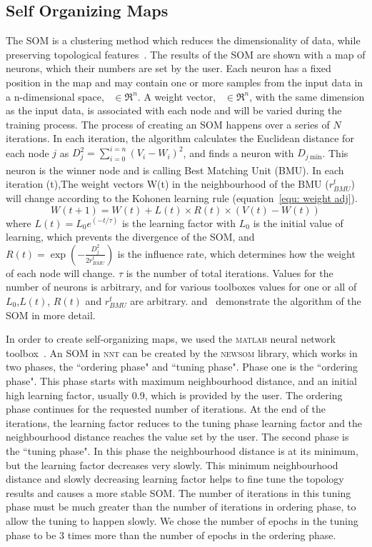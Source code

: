  \subsection{Self Organizing Maps}
 \label{sec: som}
 The SOM is a clustering method which reduces the dimensionality of data, while preserving topological features~\citep{Kohonen98}. 
 The results of the SOM are shown with a map of neurons, which their numbers are set by the user.
 Each neuron has a fixed position in the map and may contain one or more samples from the input data in a n-dimensional space,~ $\in \Re^n$.
 A weight vector,~ $\in \Re^n$, with the same dimension as the input data, is associated with each node and will be varied during the training process.
 The process of creating an SOM happens over a series of $N$ iterations.
 In each iteration, the algorithm calculates the Euclidean distance for each node $j$ as $D_j^2= \sum_{i=0}^{i=n} (V_i - W_i)^2$, and finds a neuron with $D_{j_,\mathrm{min}}$. 
 This neuron is the winner node and is calling Best Matching Unit (BMU). 
 In each iteration (t),The weight vectors W(t) in the neighbourhood of the BMU ($r^t_{BMU}$) will change according to the Kohonen learning rule (equation~\ref{equ: weight adj}). 
  \begin{equation}
            \label{equ: weight adj}
            W(t+1)=W(t)+L(t) \times R(t) \times(V(t)-W(t))
 \end{equation}
where $L(t) = L_0 e^{(-t/\tau)}$ is the learning factor with $L_0$ is the initial value of learning, which prevents the divergence of the SOM, and $R(t)=\exp(-\frac{D_j^2}{2r^t_{BMU}})$ is the influence rate, which determines how the weight of each node will change. 
$\tau$ is the number of total iterations.
Values for the number of neurons is arbitrary, and for various toolboxes values for one or all of $L_0$,$L(t)$, $R(t)$  and $r^t_{BMU}$ are arbitrary.
\cite{Geach12} and~\cite{Rahmani16b} demonstrate the algorithm of the SOM in more detail.


     In order to create self-organizing maps, we used the \textsc{matlab} neural network toolbox~\citep[NNT,][]{matlabtolbox}.
     An SOM in \textsc{nnt} can be created by the \textsc{newsom} library, which works in two phases, the ``ordering phase" and ``tuning phase". 
     Phase one is the ``ordering phase". 
     This phase starts with maximum neighbourhood distance, and an initial high learning factor, usually 0.9, which is provided by the user. 
     The ordering phase continues for the requested number of iterations.
     At the end of the iterations, the learning factor reduces to the tuning phase learning factor and the neighbourhood distance reaches the value set by the user. 
     The second phase is the ``tuning phase".
     In this phase the neighbourhood distance is at its minimum, but the learning factor decreases very slowly.
     This minimum neighbourhood distance and slowly decreasing learning factor helps to fine tune the topology results and causes a more stable SOM. 
     The number of iterations in this tuning phase must be much greater than the number of iterations in ordering phase, to allow the tuning to happen slowly. 
     We chose the number of epochs in the tuning phase to be 3 times more than the number of epochs in the ordering phase.
     
